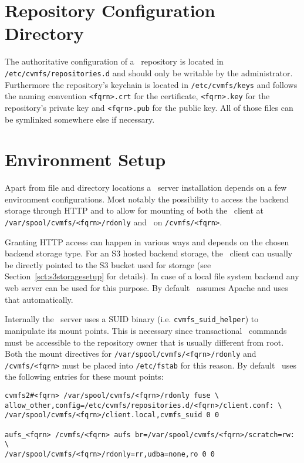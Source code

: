 \pagebreak

\section{Repository Configuration Directory}
The authoritative configuration of a \cvmfs\ repository is located in \linebreak
\texttt{/etc/cvmfs/repositories.d} and should only be writable by the administrator.
Furthermore the repository's keychain is located in \texttt{/etc/cvmfs/keys} and follows the naming convention \texttt{<fqrn>.crt} for the certificate, \texttt{<fqrn>.key} for the repository's private key and \texttt{<fqrn>.pub} for the public key.
All of those files can be symlinked somewhere else if necessary.

\pagebreak

\section{Environment Setup}
Apart from file and directory locations a \cvmfs\ server installation depends on a few environment configurations.
Most notably the possibility to access the backend storage through HTTP and to allow for mounting of both the \cvmfs\ client at \texttt{/var/spool/cvmfs/<fqrn>/rdonly} and \aufs\ on \texttt{/cvmfs/<fqrn>}.

Granting HTTP access can happen in various ways and depends on the chosen backend storage type.
For an S3 hosted backend storage, the \cvmfs\ client can usually be directly pointed to the S3 bucket used for storage (see Section~\ref{sct:s3storagesetup} for details).
In case of a local file system backend any web server can be used for this purpose.
By default \cvmfs\ assumes Apache and uses that automatically.

Internally the \cvmfs\ server uses a SUID binary (i.e. \texttt{cvmfs\_suid\_helper}) to manipulate its mount points.
This is necessary since transactional \cvmfs\ commands must be accessible to the repository owner that is usually different from root.
Both the mount directives for \texttt{/var/spool/cvmfs/<fqrn>/rdonly} and \texttt{/cvmfs/<fqrn>} must be placed into \texttt{/etc/fstab} for this reason.
By default \cvmfs\ uses the following entries for these mount points:

\begin{verbatim}
cvmfs2#<fqrn> /var/spool/cvmfs/<fqrn>/rdonly fuse \
allow_other,config=/etc/cvmfs/repositories.d/<fqrn>/client.conf: \
/var/spool/cvmfs/<fqrn>/client.local,cvmfs_suid 0 0

aufs_<fqrn> /cvmfs/<fqrn> aufs br=/var/spool/cvmfs/<fqrn>/scratch=rw: \
/var/spool/cvmfs/<fqrn>/rdonly=rr,udba=none,ro 0 0
\end{verbatim}
